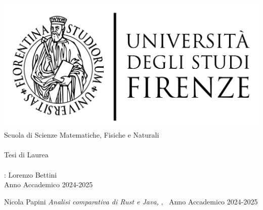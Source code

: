\newcommand{\myFaculty}{
	Scuola di Scienze Matematiche, Fisiche e Naturali\xspace}
\newcommand{\myUni}{\protect{
	Università degli Studi di Firenze}\xspace}

\begin{titlepage}
	\begin{center}
   	\large
      \hfill
      \vfill
      \begingroup
         \includegraphics[scale=0.15]{logo/LOGO}\\
			\myFaculty \\
			\myDegree \\ 
			\vspace{0.5cm}
         \vspace{0.5cm}    
         Tesi di Laurea    
         \vspace{0.5cm}    
      \endgroup 
      \vfill 
      \begingroup
      	\color{Maroon} \\ $\ $\\
	\bigskip
	\bigskip
      \endgroup
      \vfill 
      \vfill
      \mySupervisorTitle: Lorenzo Bettini\\
      \vfill
	\bigskip
	\bigskip
      \vfill
      \vfill
      \vfill
      \vfill
      \vfill
      \vfill
      \vfill
      \vfill
      Anno Accademico 2024-2025
	\end{center}        
\end{titlepage}   
   \newpage
	\thispagestyle{empty}
	\hfill
	\vfill
	\noindent Nicola Papini
	\textit{Analisi comparativa di Rust e Java,} 
	\myDegree, \textcopyright\ Anno Accademico 2024-2025
